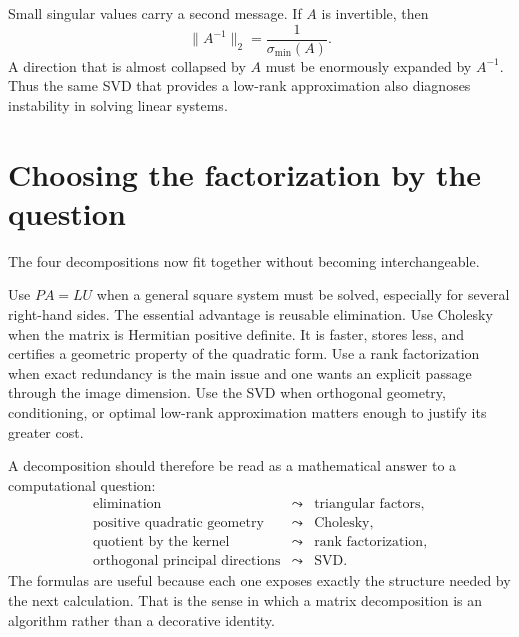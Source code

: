 Small singular values carry a second message.  If \(A\) is invertible, then
\[
  \|A^{-1}\|_2=\frac1{\sigma_{\min}(A)}.
\]
A direction that is almost collapsed by \(A\) must be enormously expanded by \(A^{-1}\).  Thus the same SVD that provides a low-rank approximation also diagnoses instability in solving linear systems.

\section{Choosing the factorization by the question}

The four decompositions now fit together without becoming interchangeable.

Use \(PA=LU\) when a general square system must be solved, especially for several right-hand sides.  The essential advantage is reusable elimination.  Use Cholesky when the matrix is Hermitian positive definite.  It is faster, stores less, and certifies a geometric property of the quadratic form.  Use a rank factorization when exact redundancy is the main issue and one wants an explicit passage through the image dimension.  Use the SVD when orthogonal geometry, conditioning, or optimal low-rank approximation matters enough to justify its greater cost.

A decomposition should therefore be read as a mathematical answer to a computational question:
\[
\begin{array}{ccl}
\text{elimination} &\leadsto& \text{triangular factors},\\
\text{positive quadratic geometry} &\leadsto& \text{Cholesky},\\
\text{quotient by the kernel} &\leadsto& \text{rank factorization},\\
\text{orthogonal principal directions} &\leadsto& \text{SVD}.
\end{array}
\]
The formulas are useful because each one exposes exactly the structure needed by the next calculation.  That is the sense in which a matrix decomposition is an algorithm rather than a decorative identity.

